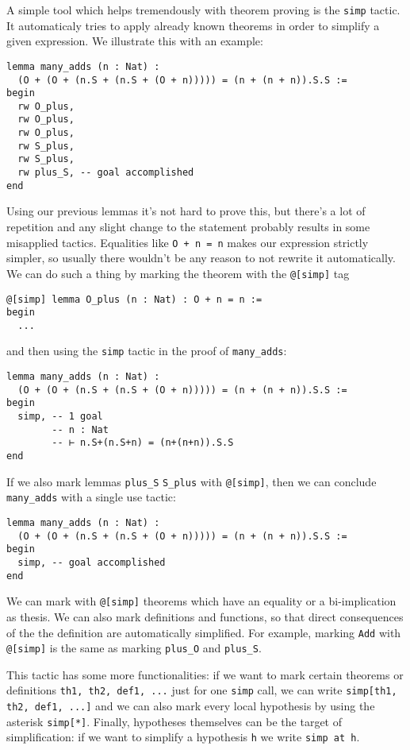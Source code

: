 \documentclass{book}
\theoremstyle{definition}
\theoremstyle{remark}
\theoremstyle{plain}
\begin{document}
A simple tool which helps tremendously with theorem proving is the \lstinline{simp} tactic.
It automaticaly tries to apply already known theorems in order to simplify a given expression.
We illustrate this with an example:
\begin{lstlisting}
lemma many_adds (n : Nat) :
  (O + (O + (n.S + (n.S + (O + n))))) = (n + (n + n)).S.S :=
begin
  rw O_plus,
  rw O_plus,
  rw O_plus,
  rw S_plus,
  rw S_plus,
  rw plus_S, -- goal accomplished
end
\end{lstlisting}
Using our previous lemmas it's not hard to prove this,
but there's a lot of repetition and any slight change to the statement probably results in some misapplied tactics.
Equalities like \lstinline{O + n = n} makes our expression strictly simpler,
so usually there wouldn't be any reason to not rewrite it automatically.
We can do such a thing by marking the theorem with the \lstinline{@[simp]} tag
\begin{lstlisting}
@[simp] lemma O_plus (n : Nat) : O + n = n :=
begin
  ...  
\end{lstlisting}
and then using the \lstinline{simp} tactic in the proof of \lstinline{many_adds}:
\begin{lstlisting}
lemma many_adds (n : Nat) :
  (O + (O + (n.S + (n.S + (O + n))))) = (n + (n + n)).S.S :=
begin
  simp, -- 1 goal
        -- n : Nat
        -- ⊢ n.S+(n.S+n) = (n+(n+n)).S.S
end
\end{lstlisting}
If we also mark lemmas \lstinline{plus_S} \lstinline{S_plus} with \lstinline{@[simp]},
then we can conclude \lstinline{many_adds} with a single use tactic:
\begin{lstlisting}
lemma many_adds (n : Nat) :
  (O + (O + (n.S + (n.S + (O + n))))) = (n + (n + n)).S.S :=
begin
  simp, -- goal accomplished
end  
\end{lstlisting}
We can mark with \lstinline{@[simp]} theorems which have an equality or a bi-implication as thesis.
We can also mark definitions and functions,
so that direct consequences of the the definition are automatically simplified.
For example, marking \lstinline{Add} with \lstinline{@[simp]} is the same as marking \lstinline{plus_O} and \lstinline{plus_S}. 

This tactic has some more functionalities: if we want to mark certain theorems or definitions \lstinline{th1, th2, def1, ...}
just for one \lstinline{simp} call, we can write \lstinline{simp[th1, th2, def1, ...]} and we can also mark every local hypothesis
by using the asterisk \lstinline{simp[*]}.
Finally, hypotheses themselves can be the target of simplification:
if we want to simplify a hypothesis \lstinline{h} we write \lstinline{simp at h}.
\end{document}

